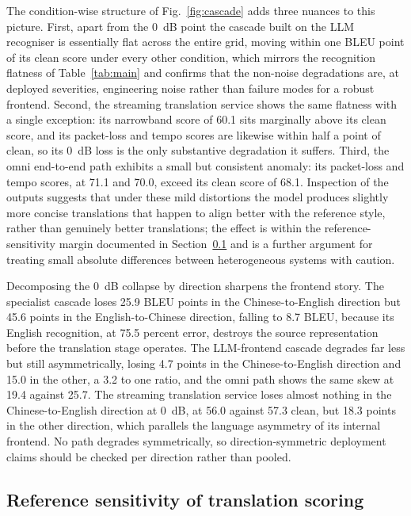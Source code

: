 The condition-wise structure of Fig.~\ref{fig:cascade} adds three nuances to
this picture. First, apart from the 0~dB point the cascade built on the LLM
recogniser is essentially flat across the entire grid, moving within one
BLEU point of its clean score under every other condition, which mirrors the
recognition flatness of Table~\ref{tab:main} and confirms that the
non-noise degradations are, at deployed severities, engineering noise rather
than failure modes for a robust frontend. Second, the streaming translation
service shows the same flatness with a single exception: its narrowband
score of 60.1 sits marginally above its clean score, and its packet-loss and
tempo scores are likewise within half a point of clean, so its 0~dB loss is
the only substantive degradation it suffers. Third, the omni end-to-end path
exhibits a small but consistent anomaly: its packet-loss and tempo scores,
at 71.1 and 70.0, exceed its clean score of 68.1. Inspection of the outputs
suggests that under these mild distortions the model produces slightly more
concise translations that happen to align better with the reference style,
rather than genuinely better translations; the effect is within the
reference-sensitivity margin documented in Section~\ref{sec:results:dual}
and is a further argument for treating small absolute differences between
heterogeneous systems with caution.

Decomposing the 0~dB collapse by direction sharpens the frontend story. The
specialist cascade loses 25.9 BLEU points in the Chinese-to-English
direction but 45.6 points in the English-to-Chinese direction, falling to
8.7 BLEU, because its English recognition, at 75.5 percent error, destroys
the source representation before the translation stage operates. The
LLM-frontend cascade degrades far less but still asymmetrically, losing 4.7
points in the Chinese-to-English direction and 15.0 in the other, a 3.2 to
one ratio, and the omni path shows the same skew at 19.4 against 25.7. The
streaming translation service loses almost nothing in the
Chinese-to-English direction at 0~dB, at 56.0 against 57.3 clean, but 18.3
points in the other direction, which parallels the language asymmetry of
its internal frontend. No path degrades symmetrically, so direction-symmetric
deployment claims should be checked per direction rather than
pooled.

\subsection{Reference sensitivity of translation scoring}
\label{sec:results:dual}

